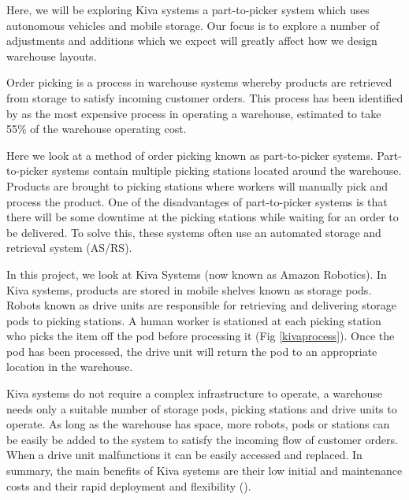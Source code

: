\documentclass[a4paper,11pt]{article}
\begin{document}
Here, we will be exploring Kiva systems a part-to-picker system which uses autonomous vehicles and mobile storage. Our focus is to explore a number of adjustments and additions which we expect will greatly affect how we design warehouse layouts.



Order picking is a process in warehouse systems whereby products are retrieved from storage to satisfy incoming customer orders. This process has been identified by \cite{de2007design} as the most expensive process in operating a warehouse, estimated to take 55\% of the warehouse operating cost.

Here we look at a method of order picking known as part-to-picker systems. Part-to-picker systems contain multiple picking stations located around the warehouse. Products are brought to picking stations where workers will manually pick and process the product. One of the disadvantages of part-to-picker systems is that there will be some downtime at the picking stations while waiting for an order to be delivered. To solve this, these systems often use an automated storage and retrieval system (AS/RS).

In this project, we look at Kiva Systems (now known as Amazon Robotics). In Kiva systems, products are stored in mobile shelves known as storage pods. Robots known as drive units are responsible for retrieving and delivering storage pods to picking stations. A human worker is stationed at each picking station who picks the item off the pod before processing it (Fig \ref{kivaprocess}). Once the pod has been processed, the drive unit will return the pod to an appropriate location in the warehouse.



Kiva systems do not require a complex infrastructure to operate, a warehouse needs only a suitable number of storage pods, picking stations and drive units to operate. As long as the warehouse has space, more robots, pods or stations can be easily be added to the system to satisfy the incoming flow of customer orders. When a drive unit malfunctions it can be easily accessed and replaced. In summary, the main benefits of Kiva systems are their low initial and maintenance costs and their rapid deployment and flexibility (\cite{wurman2008coordinating}).
\end{document}
